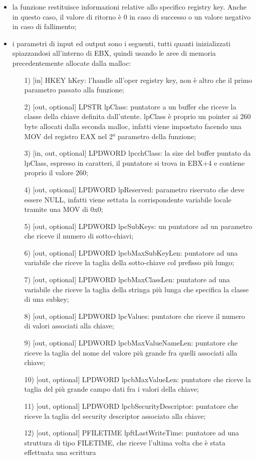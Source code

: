\documentclass[12pt]{extarticle}
\begin{document}
\begin{itemize}
\item la funzione restituisce informazioni relative allo specifico registry key. Anche in questo caso, il valore di ritorno è 0 in caso di successo o un valore negativo in caso di fallimento;
\item i parametri di input ed output sono i seguenti, tutti quanti inizializzati spiazzandosi all'interno di EBX, quindi usando le aree di memoria precedentemente allocate dalla malloc:
\begin{itemize}
\item[1)] [in] \textsf{HKEY hKey}: l'handle all'oper registry key, non è altro che il primo parametro passato alla funzione;
\item[2)] [out, optional] \textsf{LPSTR lpClass}: puntatore a un buffer che riceve la classe della chiave definita dall'utente. lpClass è proprio un pointer ai 260 byte allocati dalla seconda malloc, infatti viene impostato facendo una MOV del registro EAX nel 2° parametro della funzione;
\item[3)] [in, out, optional] \textsf{LPDWORD lpcchClass}: la size del buffer puntato da lpClass, espresso in caratteri, il puntatore si trova in EBX+4 e contiene proprio il valore 260;
\item[4)] [out, optional] \textsf{LPDWORD lpReserved}: parametro riservato che deve essere NULL, infatti viene settata la corrispondente variabile locale tramite una MOV di 0x0;
\item[5)] [out, optional] \textsf{LPDWORD lpcSubKeys}: un puntatore ad un parametro che riceve il numero di sotto-chiavi;
\item[6)] [out, optional] \textsf{LPDWORD lpcbMaxSubKeyLen}: puntatore ad una variabile che riceve la taglia della sotto-chiave col prefisso più lungo;
\item[7)] [out, optional] \textsf{LPDWORD lpcbMaxClassLen}: puntatore ad una variabile che riceve la taglia della stringa più lunga che specifica la classe di una subkey;
\item[8)] [out, optional] \textsf{LPDWORD lpcValues}: puntatore che riceve il numero di valori associati alla chiave;
\item[9)] [out, optional] \textsf{LPDWORD lpcbMaxValueNameLen}: puntatore che riceve la taglia del nome del valore più grande fra quelli associati alla chiave;
\item[10)] [out, optional] \textsf{LPDWORD lpcbMaxValueLen}: puntatore che riceve la taglia del più grande campo dati fra i valori della chiave;
\item[11)] [out, optional] \textsf{LPDWORD lpcbSecurityDescriptor}: puntatore che riceve la taglia del security descriptor associato alla chiave;
\item[12)] [out, optional] \textsf{PFILETIME lpftLastWriteTime}: puntatore ad una struttura di tipo FILETIME, che riceve l'ultima volta che è stata effettuata una scrittura 
\end{itemize}
\end{itemize}
\end{document}
